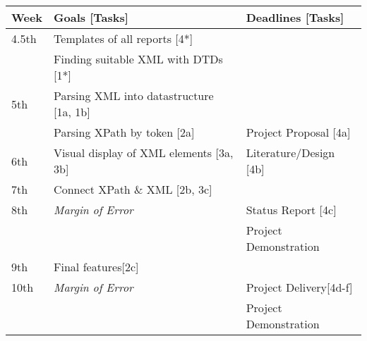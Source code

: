 \documentclass[12pt,letterpaper,final]{article}
\begin{document}
\begin{table}[!htpb]
\centering
\begin{tabular*}{\textwidth}{l|l|l}

Week 	& Goals [Tasks] 					& Deadlines [Tasks]\\
\hline
\hline
4.5th	& Templates of all reports [4*] 				& \\
 		& Finding suitable XML with DTDs [1*]	& \\
\hline
5th		& Parsing XML into datastructure [1a, 1b]		& \\
		& Parsing XPath by token [2a]	& Project Proposal [4a]\\
\hline
6th		& Visual display of XML elements [3a, 3b]	&	Literature/Design [4b]\\
\hline
7th		& Connect XPath \& XML [2b, 3c] 	& \\
\hline
8th		& \emph{Margin of Error}								& Status Report [4c]\\
		&												& Project Demonstration\\
\hline
9th		& Final features[2c]			& \\
\hline
10th	& \emph{Margin of Error}							& Project Delivery[4d-f]\\
		&												& Project Demonstration \\
\hline
\end{tabular*}
\end{table}

\nocite{*}
\renewcommand\refname{\section{Initial Reference List}}


\end{document}
